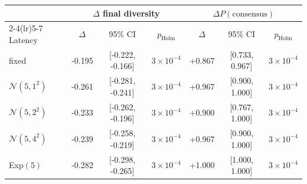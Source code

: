 \begin{tabular}{@{}lcccccc@{}}
\toprule
 & \multicolumn{3}{c}{$\Delta$ final diversity} & \multicolumn{3}{c}{$\Delta P(\mathrm{consensus})$} \\
\cmidrule(lr){2-4}\cmidrule(lr){5-7}
Latency & $\Delta$ & 95\% CI & $p_{\mathrm{Holm}}$ & $\Delta$ & 95\% CI & $p_{\mathrm{Holm}}$ \\
\midrule
fixed & -0.195 & [-0.222, -0.166] & $3\times10^{-4}$ & +0.867 & [0.733, 0.967] & $3\times10^{-4}$ \\
$\mathcal{N}(5,1^2)$ & -0.261 & [-0.281, -0.241] & $3\times10^{-4}$ & +0.967 & [0.900, 1.000] & $3\times10^{-4}$ \\
$\mathcal{N}(5,2^2)$ & -0.233 & [-0.262, -0.196] & $3\times10^{-4}$ & +0.900 & [0.767, 1.000] & $3\times10^{-4}$ \\
$\mathcal{N}(5,4^2)$ & -0.239 & [-0.258, -0.219] & $3\times10^{-4}$ & +0.967 & [0.900, 1.000] & $3\times10^{-4}$ \\
Exp$(5)$ & -0.282 & [-0.298, -0.265] & $3\times10^{-4}$ & +1.000 & [1.000, 1.000] & $3\times10^{-4}$ \\
\bottomrule
\end{tabular}
